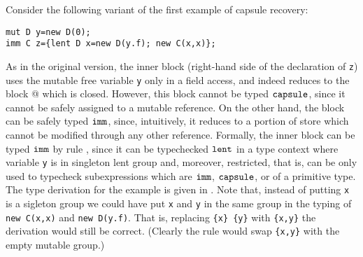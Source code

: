 {Consider the following variant of the first example of capsule {recovery}:
\begin{lstlisting}
mut D y=new D(0); 
imm C z={lent D x=new D(y.f); new C(x,x)};  
\end{lstlisting}
As in the original version, the inner block (right-hand side of the declaration of \lstinline{z}) uses the mutable free variable \lstinline{y} only in a field access, and indeed reduces to the block @ which is closed. However, this block {cannot be typed $\texttt{capsule}$}, since it cannot be safely assigned to a mutable reference. On the other hand, the block can be safely typed  $\texttt{imm}$, since, intuitively, it reduces to a portion of store which cannot be modified through any other reference. Formally, the inner block can be {typed $\texttt{imm}$} by rule , since it can be typechecked $\texttt{lent}$ in a type context where variable \lstinline{y}{} is in  singleton {lent group} and, moreover, restricted, that is, can be only used to typecheck subexpressions which are $\texttt{imm}$, $\texttt{capsule}$, or of a primitive type. 
The type derivation for the example is given in . 
{Note that, instead of putting \texttt{x} is a sigleton group we could have put \texttt{x} and \texttt{y} in the same 
group in the typing of \lstinline{new C(x,x)}{} and \lstinline{new D(y.f)}{}. That is, replacing}
\verb!{x} {y}! with \verb!{x,y}!  the derivation would still be correct. (Clearly the rule  would swap \verb!{x,y}!
with the empty mutable group.)

}
